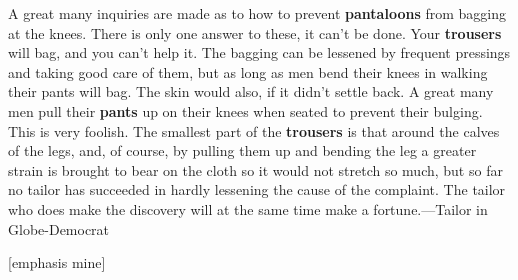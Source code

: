 \begin{ipquote}
\begin{center}
\end{center}
{A great many inquiries are made as to how to prevent \textbf{pantaloons} from bagging at the knees. There is only one answer to these, it can’t be done. Your \textbf{trousers} will bag, and you can’t help it. The bagging can be lessened by frequent pressings and taking good care of them, but as long as men bend their knees in walking their pants will bag. The skin would also, if it didn’t settle back. A great many men pull their \textbf{pants} up on their knees when seated to prevent their bulging. This is very foolish. The smallest part of the \textbf{trousers} is that around the calves of the legs, and, of course, by pulling them up and bending the leg a greater strain is brought to bear on the cloth so it would not stretch so much, but so far no tailor has succeeded in hardly lessening the cause of the complaint. The tailor who do{\kern0pt}es make the discovery will at the same time make a fortune.—Tailor in Globe-Democrat

\raggedleft
{[emphasis mine]}\\
}
\end{ipquote}

